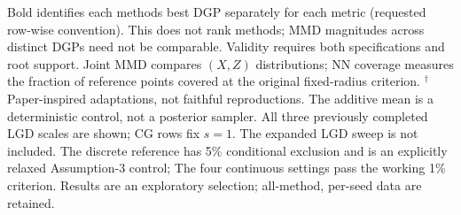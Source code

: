 \begin{table}[t]
\begin{minipage}{\textwidth}
Bold identifies each method\textquotesingle s best DGP separately for each metric (requested row-wise convention). This does not rank methods; MMD magnitudes across distinct DGPs need not be comparable.
Validity requires both specifications and root support. Joint MMD compares $(X,Z)$ distributions; NN coverage measures the fraction of reference points covered at the original fixed-radius criterion.
$^{\dagger}$Paper-inspired adaptations, not faithful reproductions. The additive mean is a deterministic control, not a posterior sampler. All three previously completed LGD scales are shown; CG rows fix $s=1$. The expanded LGD sweep is not included.
The discrete reference has 5\% conditional exclusion and is an explicitly relaxed Assumption-3 control; The four continuous settings pass the working 1\% criterion. Results are an exploratory selection; all-method, per-seed data are retained.
\end{minipage}
\end{table}
